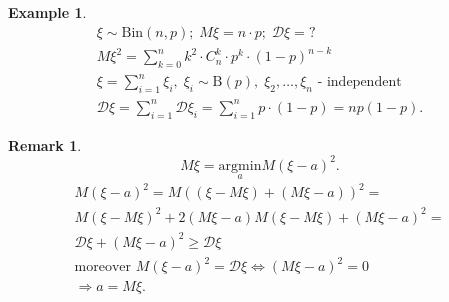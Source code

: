 \documentclass[12pt,letterpaper]{report}
\newtheorem*{example}{Example}
\newtheorem*{remark}{Remark}
\begin{document}
\begin{example}
    \begin{gather*}
        \xi \sim \text{Bin}(n,p); \; M\xi = n\cdot p;  \; \mathcal{D}\xi = ? \\
        M\xi^2 = \sum_{k=0}^{n} k^2 \cdot C_n^k \cdot p^k \cdot (1-p)^{n-k} \\
        \xi = \sum_{i=1}^{n}\xi_i, \; \xi_i \sim \text{B}(p), \; \xi_2, \dots, \xi_n \text{ - independent } \\
        \mathcal{D}\xi = \sum_{i=1}^{n} \mathcal{D}\xi_i = \sum_{i=1}^{n}p\cdot(1-p) = np(1-p).
    \end{gather*}
\end{example}

\begin{remark}
    \[
        M\xi = \underset{a}{\text{argmin}} M(\xi - a)^2
    .\] 
    \begin{gather*}
        M(\xi - a)^2 = M((\xi - M\xi) + (M\xi - a))^2 = \\
        M(\xi - M\xi)^2 + 2(M\xi -a)M(\xi-M\xi) + (M\xi-a)^2=\\
        \mathcal{D}\xi + (M\xi -a)^2 \geq \mathcal{D}\xi \\
        \text{moreover } M(\xi - a)^2 = \mathcal{D}\xi \iff (M\xi-a)^2 = 0 \\
        \Rightarrow a = M\xi.
    \end{gather*}
\end{remark}
\end{document}
